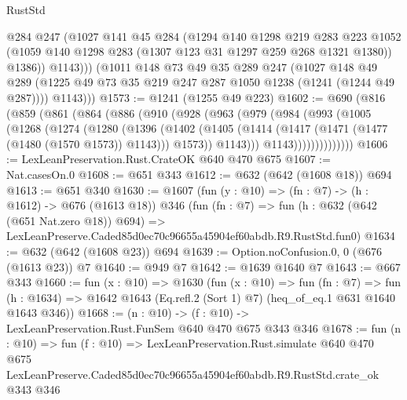\begin{lexlean}{RustStd}
\begin{coremodule}
              @284
              @247
              (@1027
                @141
                @45
                @284
                (@1294
                  @140
                  @1298
                  @219
                  @283
                  @223
                  @1052
                  (@1059 @140 @1298 @283 (@1307 @123 @31 @1297 @259 @268 @1321 @1380))
                  @1386))
              @1143)))
        (@1011
          @148
          @73
          @49
          @35
          @289
          @247
          (@1027
            @148
            @49
            @289
            (@1225 @49 @73 @35 @219 @247 @287 @1050 @1238 (@1241 (@1244 @49 @287))))
          @1143)))
@1573 := @1241 (@1255 @49 @223)
@1602 := @690
    (@816
      (@859
        (@861
          (@864
            (@886
              (@910
                (@928
                  (@963
                    (@979
                      (@984
                        (@993
                          (@1005
                            (@1268
                              (@1274
                                (@1280
                                  (@1396
                                    (@1402
                                      (@1405
                                        (@1414
                                          (@1417 (@1471 (@1477 (@1480 (@1570 @1573)) @1143)))
                                          @1573))
                                      @1143)))
                                @1143))))))))))))))
@1606 := LexLeanPreservation.Rust.CrateOK @640 @470 @675
@1607 := Nat.casesOn.{0}
@1608 := @651 @343
@1612 := @632 (@642 (@1608 @18)) @694
@1613 := @651 @340
@1630 := @1607
    (fun (y : @10) => (fn : @7) -> (h : @1612) -> @676 (@1613 @18))
    @346
    (fun (fn : @7) =>
    fun (h : @632 (@642 (@651 Nat.zero @18)) @694) =>
    LexLeanPreserve.Caded85d0ec70c96655a45904ef60abdb.R9.RustStd.fun0)
@1634 := @632 (@642 (@1608 @23)) @694
@1639 := Option.noConfusion.{0, 0} (@676 (@1613 @23)) @7
@1640 := @949 @7
@1642 := @1639 @1640 @7
@1643 := @667 @343
@1660 := fun (x : @10) =>
  @1630
    (fun (x : @10) =>
    fun (fn : @7) =>
    fun (h : @1634) => @1642 @1643 (Eq.refl.{2} (Sort 1) @7) (heq_of_eq.{1} @631 @1640 @1643 @346))
@1668 := (n : @10) -> (f : @10) -> LexLeanPreservation.Rust.FunSem @640 @470 @675 @343 @346
@1678 := fun (n : @10) =>
  fun (f : @10) =>
  LexLeanPreservation.Rust.simulate
    @640
    @470
    @675
    LexLeanPreserve.Caded85d0ec70c96655a45904ef60abdb.R9.RustStd.crate_ok
    @343
    @346
\end{coremodule}
\end{lexlean}
